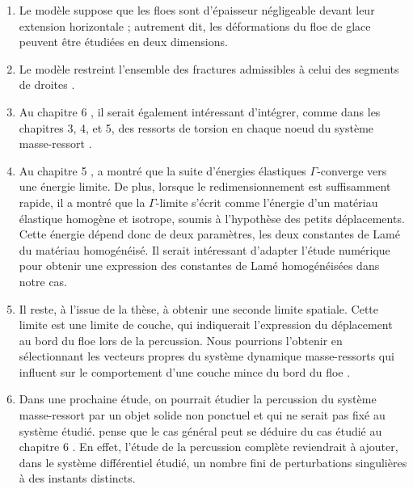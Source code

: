\begin{enumerate}
    \item Le modèle suppose que les floes sont d’épaisseur négligeable devant leur extension horizontale ; autrement dit, les déformations du floe de glace peuvent être étudiées en deux dimensions.
    \item Le modèle restreint l’ensemble des fractures admissibles à celui des segments de droites \parencite[chp.2]{balasoiu2020halthesis}.
    \item Au chapitre 6 \parencite[p.187]{balasoiu2020halthesis}, il serait également intéressant d’intégrer, comme dans les chapitres 3, 4, et 5, des ressorts de torsion en chaque noeud du système masse-ressort \parencite[p.187]{balasoiu2020halthesis}.
    \item Au chapitre 5 \citeauthor[p.183]{balasoiu2020halthesis}, \citeauthor{balasoiu2020halthesis} a montré que la suite d’énergies élastiques $\Gamma$-converge vers une énergie limite. De plus, lorsque le redimensionnement est suffisamment rapide, il a montré que la $\Gamma$-limite s’écrit comme l’énergie d’un matériau élastique homogène et isotrope, soumis à l’hypothèse des petits déplacements. Cette énergie dépend donc de deux paramètres, les deux constantes de Lamé du matériau homogénéisé. Il serait intéressant d’adapter l’étude numérique \parencite{ostoja1995linear} pour obtenir une expression des constantes de Lamé homogénéisées dans notre cas.
    \item Il reste, à l’issue de la thèse, à obtenir une seconde limite spatiale. Cette limite est une limite de couche, qui indiquerait l’expression du déplacement au bord du floe lors de la percussion. Nous pourrions l’obtenir en sélectionnant les vecteurs propres du système dynamique masse-ressorts qui influent sur le comportement d’une couche mince du bord du floe \parencite[p.201]
    {balasoiu2020halthesis}.
    \item Dans une prochaine étude, on pourrait étudier la percussion du système masse-ressort par un objet solide non ponctuel et qui ne serait pas fixé au système étudié. \citeauthor{balasoiu2020halthesis} pense que le cas général peut se déduire du cas étudié au chapitre 6 \parencite[p.187]{balasoiu2020halthesis}. En effet, l’étude de la percussion complète reviendrait à ajouter, dans le système différentiel étudié, un nombre fini de perturbations singulières à des instants distincts. 
\end{enumerate}











